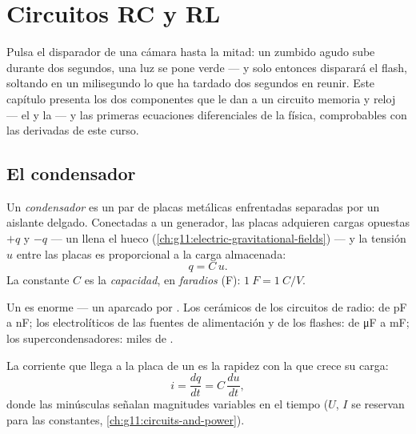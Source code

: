 \chapter{Circuitos RC y RL}\label{ch:g12:rc-rl-circuits}

Pulsa el disparador de una cámara hasta la mitad: un zumbido agudo sube durante dos
segundos, una luz se pone verde --- y solo entonces disparará el flash, soltando en un
milisegundo lo que ha tardado dos segundos en reunir. Este capítulo presenta los dos
componentes que le dan a un circuito memoria y reloj --- el  y la 
--- y las primeras ecuaciones diferenciales de la física, comprobables con las
derivadas de este curso.

\section{El condensador}

\begin{definition}\label{def:g12:rc-rl-circuits:capacitor}
Un \emph{condensador} es un par de placas metálicas enfrentadas
separadas por un aislante delgado. Conectadas a un generador, las placas adquieren
cargas opuestas $+q$ y $-q$ --- un  llena el hueco
(\cref{ch:g11:electric-gravitational-fields}) --- y la tensión $u$ entre las placas es
proporcional a la carga almacenada:
\[ q = C\,u . \]
La constante $C$ es la \emph{capacidad}, en
\emph{faradios} (\unit{F}): $\qty{1}{F} = \qty{1}{C/V}$.
\end{definition}

\begin{example}\label{ex:g12:rc-rl-circuits:orders}
Un  es enorme --- un  aparcado por . Los cerámicos de los
circuitos de radio: de \unit{pF} a \unit{nF}; los electrolíticos de las fuentes de
alimentación y de los flashes: de \unit{\micro F} a \unit{mF}; los supercondensadores:
miles de .
\end{example}

\begin{proposition}\label{prop:g12:rc-rl-circuits:cdudt}
La corriente que llega a la placa de un  es la rapidez con la que crece su
carga:
\[
i = \frac{dq}{dt} = C\,\frac{du}{dt} ,
\]
donde las minúsculas señalan magnitudes variables en el tiempo ($U$, $I$ se reservan
para las constantes, \cref{ch:g11:circuits-and-power}).
\end{proposition}

